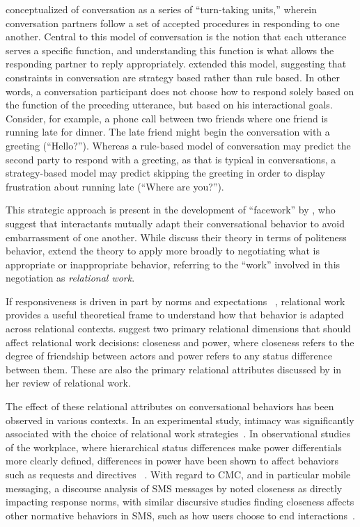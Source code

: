 \documentclass[12pt]{nuthesis}	%
\begin{document}
\citet{sacks1974simplest} conceptualized of conversation as a series of ``turn-taking units,'' wherein conversation partners follow a set of accepted procedures in responding to one another. Central to this model of conversation is the notion that each utterance serves a specific function, and understanding this function is what allows the responding partner to reply appropriately. \citet{levinson1981essential} extended this model, suggesting that constraints in conversation are strategy based rather than rule based. In other words, a conversation participant does not choose how to respond solely based on the function of the preceding utterance, but based on his interactional goals. Consider, for example, a phone call between two friends where one friend is running late for dinner. The late friend might begin the conversation with a greeting (``Hello?''). Whereas a rule-based model of conversation may predict the second party to respond with a greeting, as that is typical in conversations, a strategy-based model may predict skipping the greeting in order to display frustration about running late (``Where are you?'').

This strategic approach is present in the development of ``facework'' by \citet{brown1987politeness}, who suggest that interactants mutually adapt their conversational behavior to avoid embarrassment of one another. While \citeauthor{brown1987politeness} discuss their theory in terms of politeness behavior, \citet{locher2005politeness} extend the theory to apply more broadly to negotiating what is appropriate or inappropriate behavior, referring to the ``work'' involved in this negotiation as \textit{relational work}.

If responsiveness is driven in part by norms and expectations ~\citep[e.g.,][]{bayer2015connection, church2013s,rettie2009mobile}, relational work provides a useful theoretical frame to understand how that behavior is adapted across relational contexts. \citet{brown1987politeness} suggest two primary relational dimensions that should affect relational work decisions: closeness and power, where closeness refers to the degree of friendship between actors and power refers to any status difference between them. These are also the primary relational attributes discussed by \citet{spencer2011conceptualising} in her review of relational work.

The effect of these relational attributes on conversational behaviors has been observed in various contexts. In an experimental study, intimacy was significantly associated with the choice of relational work strategies~\citep{meyer2004repairing}. In observational studies of the workplace, where hierarchical status differences make power differentials more clearly defined, differences in power have been shown to affect behaviors such as requests and directives~\citep{craven2010directives,vine2009directives} . With regard to CMC, and in particular mobile messaging, a discourse analysis of SMS messages by \citet{laursen2005please} noted closeness as directly impacting response norms, with similar discursive studies finding closeness affects other normative behaviors in SMS, such as how users choose to end interactions~\citep{spilioti2011beyond}.
\end{document}
